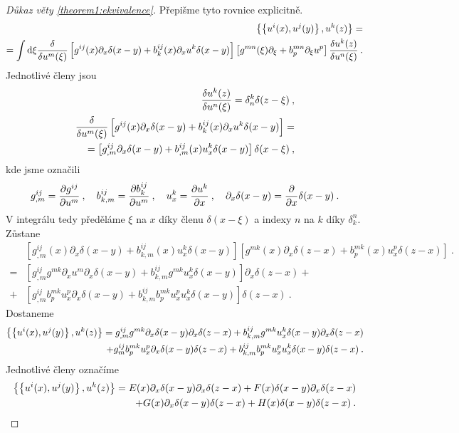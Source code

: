 \begin{proof}[Důkaz věty \ref{theorem1:ekvivalence}]
    Přepišme tyto rovnice explicitně. 
    \begin{align*}
        \left \lbrace \left \lbrace u^i(x),u^j(y) \right \rbrace,u^k(z) \right \rbrace = \\
        = \int \mathrm{d} \xi \frac{\delta }{\delta u^m(\xi)} \left[ g^{ij}(x) \partial_x \delta(x-y) + b^{ij}_k(x) \partial_x u^k \delta(x-y)\right] 
        \left[ g^{mn}(\xi) \partial_\xi + b^{mn}_p \partial_\xi u^p \right] \frac{\delta u^k(z)}{\delta u^n(\xi)} \:.
    \end{align*}
    Jednotlivé členy jsou
    \begin{align}
        \frac{\delta u^k(z)}{\delta u^n(\xi)} = \delta^k_n \delta(z-\xi) \:, \\
        \frac{\delta }{\delta u^m(\xi)} \left[ g^{ij}(x) \partial_x \delta(x-y) + b^{ij}_k(x) \partial_x u^k \delta(x-y)\right] = 
        \\ = \left[ g^{ij}_{,m} \partial_x \delta(x-y) + b^{ij}_{,m}(x) u^k_x \delta(x-y) \right] \delta (x-\xi) \:,
    \end{align}
    kde jsme označili
    \begin{align}
        g^{ij}_{,m} = \frac{\partial g^{ij}}{\partial u^m} \:, \quad b^{ij}_{k,m} = \frac{\partial b^{ij}_k}{\partial u^m} \:, \quad u^k_x = \frac{\partial u^k}{\partial x} \:, \quad \partial_x \delta(x-y) = \frac{\partial }{\partial x} \delta(x-y) \:.
    \end{align}
    V integrálu tedy předěláme $\xi$ na $x$ díky členu $\delta(x-\xi)$ a indexy $n$ na $k$ díky $\delta^n_k$. Zůstane
    \begin{align*}
        & \left[ g^{ij}_{,m}(x) \partial_x \delta(x-y) + b^{ij}_{k,m}(x) u^k_x \delta(x-y) \right] \left[ g^{mk}(x) \partial_x \delta(z-x) + b^{mk}_p(x) u^p_x \delta(z-x)\right] \:.
        \\ 
        =& \left[ g^{ij}_{,m} g^{mk} \partial_x u^m \partial_x \delta(x-y) + b^{ij}_{k,m} g^{mk} u^k_x \delta(x-y) \right] \partial_x \delta(z-x) + 
        \\
        +& \left[ g^{ij}_{,m} b^{mk}_p u^p_x \partial_x \delta(x-y) + b^{ij}_{k,m} b^{mk}_p u_x^p  u_x^k \delta(x-y) \right] \delta(z-x) \:.
    \end{align*}
    Dostaneme
    \begin{align*}
        \left \lbrace \left \lbrace u^i(x),u^j(y) \right \rbrace,u^k(z) \right \rbrace 
        =g^{ij}_{,m} g^{mk} \partial_x \delta(x-y) \partial_x \delta(z-x) 
        + b^{ij}_{k,m} g^{mk} u^k_x \delta(x-y) \partial_x \delta(z-x) 
        \\+ g^{ij}_m b^{mk}_p u^p_x  \partial_x \delta(x-y) \delta(z-x) 
        + b^{ij}_{k,m} b^{mk}_p u^p_x u^k_x \delta(x-y) \delta(z-x) \:.
    \end{align*}
    Jednotlivé členy označíme \begin{align*}
        \left \lbrace \left \lbrace u^i(x),u^j(y) \right \rbrace,u^k(z) \right \rbrace = E(x) \partial_x \delta(x-y) \partial_x \delta(z-x) + F(x) \delta (x-y) \partial_x \delta(z-x) 
        \\+ G(x) \partial_x \delta(x-y) \delta(z-x) + H(x) \delta(x-y) \delta(z-x) \:.
    \end{align*}




\end{proof}
